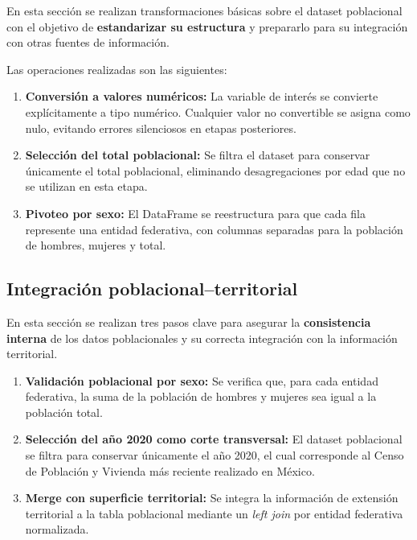 \documentclass[12pt,letterpaper]{article}
\begin{document}
En esta sección se realizan transformaciones básicas sobre el dataset poblacional con el objetivo de \textbf{estandarizar su estructura} y prepararlo para su integración con otras fuentes de información.

Las operaciones realizadas son las siguientes:

\begin{enumerate}
    \item \textbf{Conversión a valores numéricos:} La variable de interés se convierte explícitamente a tipo numérico. Cualquier valor no convertible se asigna como nulo, evitando errores silenciosos en etapas posteriores.
    \item \textbf{Selección del total poblacional:} Se filtra el dataset para conservar únicamente el total poblacional, eliminando desagregaciones por edad que no se utilizan en esta etapa.
    \item \textbf{Pivoteo por sexo:} El DataFrame se reestructura para que cada fila represente una entidad federativa, con columnas separadas para la población de hombres, mujeres y total.
\end{enumerate}

\subsection{Integración poblacional--territorial}

En esta sección se realizan tres pasos clave para asegurar la \textbf{consistencia interna} de los datos poblacionales y su correcta integración con la información territorial.

\begin{enumerate}
    \item \textbf{Validación poblacional por sexo:} Se verifica que, para cada entidad federativa, la suma de la población de hombres y mujeres sea igual a la población total.
    \item \textbf{Selección del año 2020 como corte transversal:} El dataset poblacional se filtra para conservar únicamente el año 2020, el cual corresponde al Censo de Población y Vivienda más reciente realizado en México.
    \item \textbf{Merge con superficie territorial:} Se integra la información de extensión territorial a la tabla poblacional mediante un \textit{left join} por entidad federativa normalizada.
\end{enumerate}

\newpage
\end{document}

